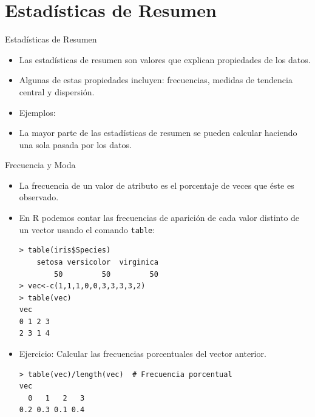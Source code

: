 \documentclass[handout]{beamer}
\begin{document}
\section{Estadísticas de Resumen}
\begin{frame}[fragile]{Estadísticas de Resumen}
\scriptsize{
\begin{itemize}
 \item Las estadísticas de resumen son valores que explican propiedades de los datos.
 \item Algunas de estas propiedades incluyen: frecuencias, medidas de tendencia central y dispersión.
 \item Ejemplos: 
 
 \item La mayor parte de las estadísticas de resumen se pueden calcular haciendo una sola pasada por los datos.

\end{itemize}



}
 
\end{frame}

\begin{frame}[fragile]{Frecuencia y Moda}
\scriptsize{
\begin{itemize}
 \item La frecuencia de un valor de atributo es el porcentaje de veces que éste es observado.
 \item En R podemos contar las frecuencias de aparición de cada valor distinto de un vector usando el comando \verb+table+: 
 \begin{verbatim}
> table(iris$Species)
    setosa versicolor  virginica 
        50         50         50  
> vec<-c(1,1,1,0,0,3,3,3,3,2)
> table(vec)
vec
0 1 2 3 
2 3 1 4 
 \end{verbatim} 
 \item Ejercicio: Calcular las frecuencias porcentuales del vector anterior. \pause
 \begin{verbatim}
> table(vec)/length(vec)  # Frecuencia porcentual
vec
  0   1   2   3 
0.2 0.3 0.1 0.4   
\end{verbatim}

 

\end{itemize}

 
 
} 
\end{frame}
\end{document}

